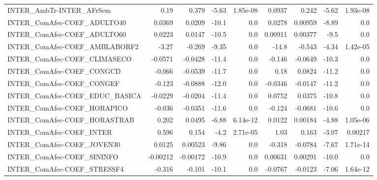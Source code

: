 \begin{tabular}{lrrrrrrrr}
INTER\_AmbTr-INTER\_AFrSem              &        0.19 &        0.379 &    -5.63 & 1.85e-08 &     0.0937 &       0.242 &        -5.62 &      1.93e-08 \\
INTER\_ComAfec-COEF\_ADULTO40           &      0.0369 &       0.0209 &    -10.1 &      0.0 &     0.0278 &     0.00959 &        -8.89 &           0.0 \\
INTER\_ComAfec-COEF\_ADULTO60           &      0.0223 &       0.0147 &    -10.5 &      0.0 &    0.00911 &     0.00377 &         -9.5 &           0.0 \\
INTER\_ComAfec-COEF\_AMBLABORF2         &       -3.27 &       -0.269 &    -9.35 &      0.0 &      -14.8 &      -0.543 &        -4.34 &      1.42e-05 \\
INTER\_ComAfec-COEF\_CLIMASECO          &     -0.0571 &      -0.0428 &    -11.4 &      0.0 &     -0.146 &     -0.0649 &        -10.3 &           0.0 \\
INTER\_ComAfec-COEF\_CONGCD             &      -0.066 &      -0.0539 &    -11.7 &      0.0 &       0.18 &      0.0824 &        -11.2 &           0.0 \\
INTER\_ComAfec-COEF\_CONGEF             &      -0.123 &      -0.0888 &    -12.0 &      0.0 &    -0.0346 &     -0.0147 &        -11.2 &           0.0 \\
INTER\_ComAfec-COEF\_EDUC\_BASICA        &     -0.0229 &      -0.0204 &    -11.4 &      0.0 &     0.0752 &      0.0375 &        -10.8 &           0.0 \\
INTER\_ComAfec-COEF\_HORAPICO           &      -0.036 &      -0.0351 &    -11.6 &      0.0 &     -0.124 &     -0.0681 &        -10.6 &           0.0 \\
INTER\_ComAfec-COEF\_HORASTRAB          &       0.202 &       0.0495 &    -6.88 & 6.14e-12 &     0.0122 &     0.00184 &        -4.88 &      1.05e-06 \\
INTER\_ComAfec-COEF\_INTER              &       0.596 &        0.154 &     -4.2 & 2.71e-05 &       1.03 &       0.163 &        -3.07 &       0.00217 \\
INTER\_ComAfec-COEF\_JOVEN30            &      0.0125 &      0.00523 &    -9.86 &      0.0 &     -0.318 &     -0.0784 &        -7.67 &      1.71e-14 \\
INTER\_ComAfec-COEF\_SININFO            &    -0.00212 &     -0.00172 &    -10.9 &      0.0 &    0.00631 &     0.00291 &        -10.0 &           0.0 \\
INTER\_ComAfec-COEF\_STRESSF4           &      -0.316 &       -0.101 &    -10.1 &      0.0 &    -0.0767 &     -0.0123 &        -7.06 &      1.64e-12 \\

\end{tabular}
